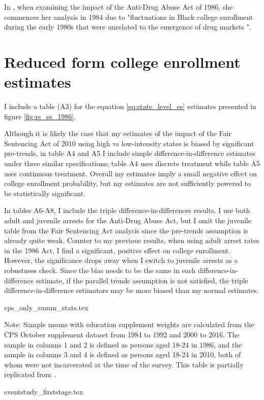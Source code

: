 \documentclass{article}
\begin{document}
  In \cite{britton2022}, when examining the impact of the Anti-Drug Abuse Act of 1986, she commences her analysis in 1984 due to "fluctuations in Black college enrollment during the early 1980s that were unrelated to the emergence of drug markets \cite{nces}".

  \section{Reduced form college enrollment estimates}
  I include a table (A3) for the equation \ref{eq:state_level_es} estimates presented in figure \ref{fig:rs_es_1986}.

  Although it is likely the case that my estimates of the impact of the Fair Sentencing Act of 2010 using high vs low-intensity states is biased by significant pre-trends, in table A4 and A5 I include simple difference-in-difference estimates under three similar specifications; table A4 uses discrete treatment while table A5 uses continuous treatment. Overall my estimates imply a small negative effect on college enrollment probability, but my estimates are not sufficiently powered to be statistically significant.

  In tables A6-A8, I include the triple difference-in-differences results. I use both adult and juvenile arrests for the Anti-Drug Abuse Act, but I omit the juvenile table from the Fair Sentencing Act analysis since the pre-trends assumption is already quite weak. Counter to my previous results, when using adult arrest rates in the 1986 Act, I find a significant, positive effect on college enrollment. However, the significance drops away when I switch to juvenile arrests as a robustness check. Since the bias needs to be the same in each difference-in-difference estimate, if the parallel trends assumption is not satisfied, the triple difference-in-difference estimators may be more biased than my normal estimates.


  \clearpage

  
  
  \clearpage

  {cps_only_summ_stats.tex}
  \begin{footnotesize}
    \noindent Note: Sample means with education supplement weights are calculated from the CPS October supplement dataset from 1984 to 1992 and 2000 to 2016. The sample in columns 1 and 2 is defined as persons aged 18-24 in 1986, and the sample in columns 3 and 4 is defined as persons aged 18-24 in 2010, both of whom were not incarcerated at the time of the survey. This table is partially replicated from \cite{britton2022}.
  \end{footnotesize}
  \clearpage
  {eventstudy_firststage.tex}
\end{document}
